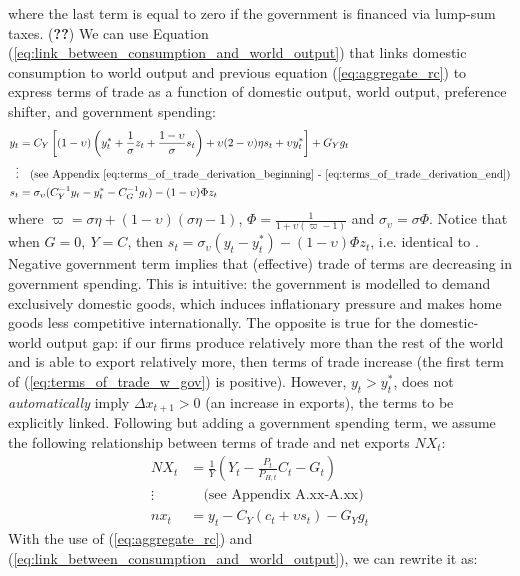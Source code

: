 where the last term is equal to zero if the government is financed via lump-sum taxes. (\textbf{??}) We can use Equation (\ref{eq:link_between_consumption_and_world_output}) that links domestic consumption to world output and previous equation (\ref{eq:aggregate_rc}) to express terms of trade as a function of domestic output, world output, preference shifter, and government spending:
\begin{align}
    y_t &= C_Y\left[(1-\upsilon)\left( y^*_t + \frac{1}{\sigma}z_t + \frac{1-\upsilon}{\sigma}s_t \right) + \upsilon (2-\upsilon)\eta s_t + \upsilon y^*_t\right] + G_Y g_t \\
    \vdots & \quad \text{(see Appendix \ref{eq:terms_of_trade_derivation_beginning} - \ref{eq:terms_of_trade_derivation_end})} \nonumber \\
    s_t &= \sigma_\upsilon(C_Y^{-1} y_t - y^*_t - C_G^{-1} g_t) - (1-\upsilon)\Phi z_t \label{eq:terms_of_trade_w_gov}
\end{align}
where $\varpi = \sigma \eta + (1-\upsilon)(\sigma \eta - 1)$, $\Phi = \frac{1}{1 + \upsilon (\varpi - 1)}$ and $\sigma_\upsilon = \sigma \Phi$. Notice that when $G=0,\ Y=C$, then $s_t = \sigma_\upsilon(y_t - y^*_t) - (1-\upsilon)\Phi z_t$, i.e. identical to \textcite{jordigal_2015_monetary}. Negative government term implies that (effective) trade of terms are decreasing in government spending. This is intuitive: the government is modelled to demand exclusively domestic goods, which induces inflationary pressure and makes home goods less competitive internationally. The opposite is true for the domestic-world output gap: if our firms produce relatively more than the rest of the world and is able to export relatively more, then terms of trade increase (the first term of (\ref{eq:terms_of_trade_w_gov}) is positive). However, $y_t > y^*_t$, does not \textit{automatically} imply $\Delta x_{t+1} > 0$ (an increase in exports), the terms to be explicitly linked. Following \textcite{jordigal_2015_monetary} but adding a government spending term, we assume the following relationship between terms of trade and net exports $NX_t$:
\begin{align}
    NX_t &= \frac{1}{Y}\left( Y_t - \frac{P_t}{P_{H,t}}C_t - G_t\right) \\
    \vdots & \quad \text{(see Appendix A.xx-A.xx)} \nonumber \\
    nx_t &= y_t - C_Y\left( c_t + \upsilon s_t \right) - G_Y g_t \label{eq:trade_balance_w_consumption}
\end{align}
With the use of (\ref{eq:aggregate_rc}) and (\ref{eq:link_between_consumption_and_world_output}), we can rewrite it as:
